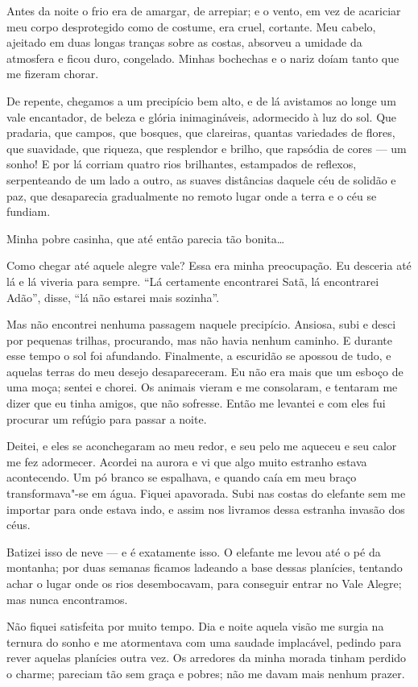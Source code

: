 Antes da noite o frio era de amargar, de arrepiar; e o vento, em vez de acariciar meu corpo
desprotegido como de costume, era cruel, cortante. Meu cabelo, ajeitado em
duas longas tranças sobre as costas, absorveu a umidade da atmosfera e ficou
duro, congelado. Minhas bochechas e o nariz doíam tanto que me fizeram chorar.

De repente, chegamos a um precipício bem alto, e de lá avistamos
ao longe um vale encantador, de beleza e glória inimagináveis,
adormecido à luz do sol. Que pradaria, que campos, que bosques, que clareiras, quantas
variedades de flores, que suavidade, que riqueza, que resplendor e brilho, que
rapsódia de cores --- um sonho! E por lá corriam quatro rios brilhantes,
estampados de reflexos, serpenteando de um lado a outro, as suaves distâncias
daquele céu de solidão e paz, que desaparecia gradualmente no remoto lugar
onde a terra e o céu se fundiam.

Minha pobre casinha, que até então parecia tão bonita\ldots{}

Como chegar até aquele alegre vale? Essa era minha preocupação. Eu desceria até lá
e lá viveria para sempre. “Lá certamente encontrarei Satã, lá encontrarei Adão”,
disse, “lá não estarei mais sozinha”.

Mas não encontrei nenhuma passagem naquele precipício. Ansiosa, subi e desci
por pequenas trilhas, procurando, mas não havia nenhum caminho. E durante
esse tempo o sol foi afundando. Finalmente, a escuridão se apossou de tudo, e
aquelas terras do meu desejo desapareceram. Eu não era mais que um esboço de uma
moça; sentei e chorei. Os animais vieram e me consolaram, e tentaram me
dizer que eu tinha amigos, que não sofresse. Então me levantei e com eles fui
procurar um refúgio para passar a noite.

Deitei, e eles se aconchegaram ao meu redor, e seu pelo me aqueceu e seu calor me fez adormecer.
Acordei na aurora e vi que
algo muito estranho estava acontecendo. Um pó branco se espalhava, e
quando caía em meu braço transformava"-se em água. Fiquei apavorada. Subi
nas costas do elefante sem me importar para onde estava indo, e assim nos
livramos dessa estranha invasão dos céus.

Batizei isso de neve --- e é exatamente isso. O elefante me levou até o pé da
montanha; por duas semanas ficamos ladeando a base dessas planícies, tentando
achar o lugar onde os rios desembocavam, para conseguir entrar no Vale Alegre;
mas nunca encontramos.

Não fiquei satisfeita por muito tempo. Dia e noite aquela visão me surgia na
ternura do sonho e me atormentava com uma saudade implacável, pedindo para rever
aquelas planícies outra vez. Os arredores da minha morada tinham perdido o
charme; pareciam tão sem graça e pobres; não me davam mais nenhum prazer.

